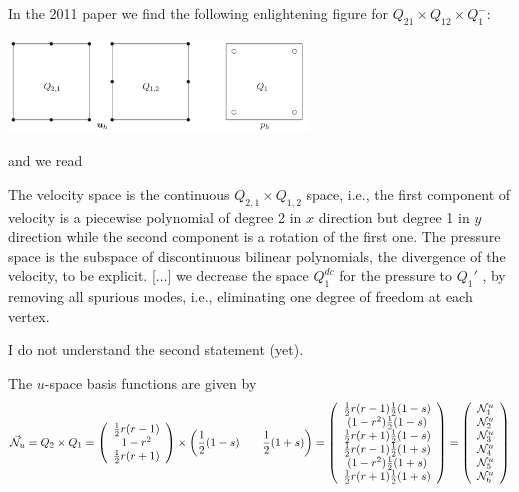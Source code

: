 In the 2011 paper we find the following enlightening figure for $Q_{21}\times Q_{12}\times Q_1^-$:
\begin{center}
\includegraphics[width=8cm]{images/pair_qqq/huzh11}
\end{center}
and we read
\begin{displayquote}
{\color{darkgray}
The velocity
space is the continuous $Q_{2,1}\times Q_{1,2}$ space, i.e., the ﬁrst component of velocity
is a piecewise polynomial of degree 2 in $x$ direction but degree 1 in $y$ direction
while the second component is a rotation of the ﬁrst one. The pressure space
is the subspace of discontinuous bilinear polynomials, the divergence of the
velocity, to be explicit.
[...]
we decrease the space $Q_1^{dc}$ for the pressure to $Q_1'$ , by removing all spurious modes, i.e.,
eliminating one degree of freedom at each vertex.
}
\end{displayquote}
I do not understand the second statement (yet).


The $u$-space basis functions are given by 
\[
\vec{{\mathcal{N}}}_u = Q_2 \times Q_1 =
\left(
\begin{array}{c}
\frac12 r(r-1) \\
1-r^2 \\
\frac12 r(r+1)
\end{array}
\right)
\times
\left(
\frac12 (1-s) \qquad \frac12(1+s)
\right)
=
\left(
\begin{array}{c}
\frac12 r(r-1)  \frac12(1-s)\\ 
(1-r^2)         \frac12(1-s)\\
\frac12 r(r+1)  \frac12(1-s)\\
\frac12 r(r-1)  \frac12(1+s)\\
(1-r^2)         \frac12(1+s)\\
\frac12 r(r+1)  \frac12(1+s)
\end{array}
\right)
=
\left(
\begin{array}{c}
{\mathcal{N}}_1^u \\ 
{\mathcal{N}}_2^u \\ 
{\mathcal{N}}_3^u \\ 
{\mathcal{N}}_4^u \\ 
{\mathcal{N}}_5^u \\ 
{\mathcal{N}}_6^u 
\end{array}
\right)
\]

